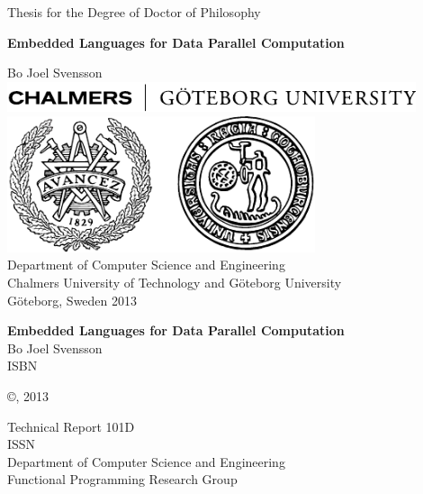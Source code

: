 \documentclass[a4paper]{book}
\newcommand{\thesistitle}{Embedded Languages for Data Parallel Computation}
\newcommand{\dept}{Department of Computer Science and Engineering}
\newcommand{\uni}{Chalmers University of Technology and G\"oteborg University}
\newcommand{\group}{Functional Programming Research Group}
\begin{document}
\begin{titlepage}
\begin{centering}
{\sc Thesis for the Degree of Doctor of Philosophy}
\vspace{30ex}

{\LARGE\bf\thesistitle}

\vspace{7ex}

\large Bo Joel Svensson
\vfill
\includegraphics[width=120mm]{./img/ChalmGUtextsvEng}\\[5mm]
\includegraphics[height=4cm]{./img/ChalmGUmarke}\\

\vspace{1cm}
\normalsize
{\sc \dept}\\
{\sc \uni}\\
G\"oteborg, Sweden 2013

\end{centering}
\end{titlepage}


\quad \vfill

{\noindent\large\bf\thesistitle} \\
\noindent Bo Joel Svensson \\
\noindent ISBN \\

\vspace{1cm}

\noindent\copyright {}, 2013 \\ 
\vspace{1cm} 

\noindent Technical Report 101D\\
\noindent ISSN                 \\
\noindent \dept \\
\noindent \group\\
\end{document}
